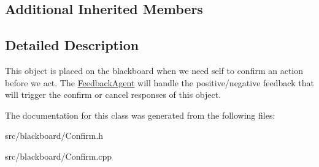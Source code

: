 \subsection*{Additional Inherited Members}


\subsection{Detailed Description}
This object is placed on the blackboard when we need self to confirm an action before we act. The \hyperlink{class_feedback_agent}{Feedback\+Agent} will handle the positive/negative feedback that will trigger the confirm or cancel responses of this object. 

The documentation for this class was generated from the following files\+:\begin{DoxyCompactItemize}
\item 
src/blackboard/Confirm.\+h\item 
src/blackboard/Confirm.\+cpp\end{DoxyCompactItemize}
